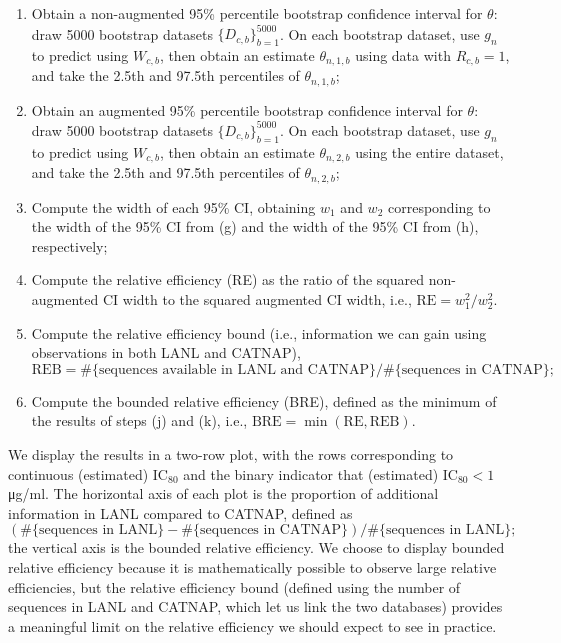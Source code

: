 \documentclass[10pt]{article}
\begin{document}
\begin{enumerate}
\begin{enumerate}
    \item Obtain a non-augmented 95\% percentile bootstrap confidence interval for $\theta$: draw 5000 bootstrap datasets $\{D_{c,b}\}_{b = 1}^{5000}$. On each bootstrap dataset, use $g_n$ to predict using $W_{c,b}$, then obtain an estimate $\theta_{n,1,b}$ using data with $R_{c,b} = 1$, and take the 2.5th and 97.5th percentiles of $\theta_{n,1,b}$;
    \item Obtain an augmented 95\% percentile bootstrap confidence interval for $\theta$: draw 5000 bootstrap datasets $\{D_{c,b}\}_{b = 1}^{5000}$. On each bootstrap dataset, use $g_n$ to predict using $W_{c,b}$, then obtain an estimate $\theta_{n,2,b}$ using the entire dataset, and take the 2.5th and 97.5th percentiles of $\theta_{n,2,b}$;
    \item Compute the width of each 95\% CI, obtaining $w_1$ and $w_2$ corresponding to the width of the 95\% CI from (g) and the width of the 95\% CI from (h), respectively;
    \item Compute the relative efficiency (RE) as the ratio of the squared non-augmented CI width to the squared augmented CI width, i.e., $\text{RE} = w_1^2 / w_2^2$.
    \item Compute the relative efficiency bound (i.e., information we can gain using observations in both LANL and CATNAP), $$\text{REB} = \#\{\text{sequences available in LANL and CATNAP}\} / \#\{\text{sequences in CATNAP}\};$$
    \item Compute the bounded relative efficiency (BRE), defined as the minimum of the results of steps (j) and (k), i.e., $\text{BRE} = \min(\text{RE}, \text{REB})$.
  \end{enumerate}
\end{enumerate}
We display the results in a two-row plot, with the rows corresponding to continuous (estimated) IC$_{80}$ and the binary indicator that (estimated) IC$_{80} < 1$ \si{\ug}/ml. The horizontal axis of each plot is the proportion of additional information in LANL compared to CATNAP, defined as $$(\#\{\text{sequences in LANL}\} - \#\{\text{sequences in CATNAP}\}) / \#\{\text{sequences in LANL}\};$$ the vertical axis is the bounded relative efficiency. We choose to display bounded relative efficiency because it is mathematically possible to observe large relative efficiencies, but the relative efficiency bound (defined using the number of sequences in LANL and CATNAP, which let us link the two databases) provides a meaningful limit on the relative efficiency we should expect to see in practice.
\end{document}
